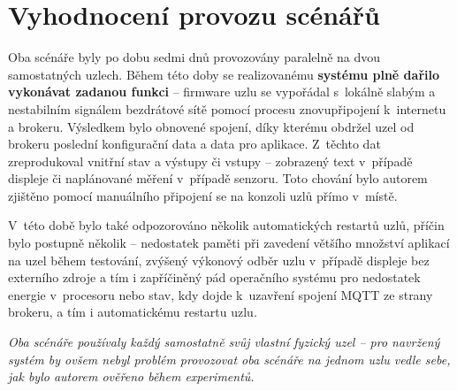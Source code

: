 \section{Vyhodnocení provozu scénářů}\label{sec:vyhodnocení}

Oba scénáře byly po dobu sedmi dnů provozovány paralelně na dvou samostatných uzlech.
Během této doby se realizovanému \textbf{systému plně dařilo vykonávat zadanou funkci} -- firmware uzlu se vypořádal
s~lokálně slabým a nestabilním signálem bezdrátové sítě pomocí procesu znovupřipojení k~internetu a brokeru.
Výsledkem bylo obnovené spojení, díky kterému obdržel uzel od brokeru poslední konfigurační data a data pro
aplikace.
Z~těchto dat zreprodukoval vnitřní stav a výstupy či vstupy -- zobrazený text v~případě displeje či naplánované měření
v~případě senzoru.
Toto chování bylo autorem zjištěno pomocí manuálního připojení se na konzoli uzlů přímo v~místě.

V~této době bylo také odpozorováno několik automatických restartů uzlů, příčin bylo postupně několik -- nedostatek
paměti při zavedení většího množství aplikací na uzel během testování, zvýšený výkonový odběr uzlu v~případě
displeje bez externího zdroje a tím i zapříčiněný pád operačního systému pro nedostatek energie v~procesoru nebo
stav, kdy dojde k~uzavření spojení MQTT ze strany brokeru, a tím i automatickému restartu uzlu.

\textit{Oba scénáře používaly každý samostatně svůj vlastní fyzický uzel -- pro navržený systém by ovšem nebyl
problém provozovat oba scénáře na jednom uzlu vedle sebe, jak bylo autorem ověřeno během experimentů.}